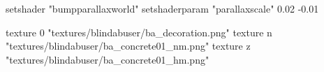 	setshader "bumpparallaxworld"
	setshaderparam "parallaxscale" 0.02 -0.01

		texture 0 "textures/blindabuser/ba_decoration.png"
		texture n "textures/blindabuser/ba_concrete01_nm.png"
		texture z "textures/blindabuser/ba_concrete01_hm.png"
